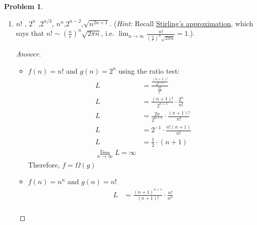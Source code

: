 \documentclass[11pt]{article}
\theoremstyle{definition}
\theoremstyle{definition}
\newtheorem{required}{Problem}
\theoremstyle{definition}
\begin{document}
\begin{required}
\begin{enumerate}[label=(\alph*)]
\begin{proof}[Answer]
        \begin{itemize}
            \item These functions grow at the same asymptotic rate and the slowest:  $4$ and $n^{log_n5}$
            \item This function grows faster than the previous: $f(n) = n^{log_n(n^2)}$
            \item This function grows faster than the previous: $f(n) = n^{log_5n}$
            \item This function grows the fastest: $f(n) = n^{log_3n}$
    \end{itemize}
        \end{proof}
        \newpage

\subsection{Problem 2\ref{2b}}
        \item \label{2b} $n!$ , \qquad $2^n$ ,\qquad  $2^{n/3}$, \qquad  $n^n$,\qquad $2^{n-2}$,\qquad  $\sqrt{n^{2n+1}}$. (\emph{Hint:} Recall \href{https://en.wikipedia.org/wiki/Stirling\%27s_approximation}{Stirling's approximation}, which says that $n! \sim \left(\frac{n}{e}\right)^n \sqrt{2 \pi n}$, i.e. $\lim_{n \to \infty} \frac{n!}{\left(\frac{n}{e}\right)^n \sqrt{2 \pi n}} = 1$.).
        \begin{proof}[Answer]
        \begin{itemize}
            \item $f(n) = n!$ and $g(n) = 2^n$ using the ratio test: 
            \begin{align*}
                L  &= \frac{\frac{(n+1)!}{2^{n+1}}}{\frac{n!}{2^n}} \\
                L &= \frac{(n+1)!}{2^{n+1}} \cdot \frac{2^n}{n!} \\
                L &= \frac{2n}{2^{n+1}} \cdot \frac{(n+1)!}{n!} \\
                L &= 2^{-1} \cdot \frac{n!(n+1)}{n!} \\
                L &=\frac{1}{2} \cdot (n+1) \\
                \lim_{n \to \infty} L = \infty
            \end{align*}
            Therefore, $f=\Omega (g)$
            \item  $f(n) = n^n$ and $g(n) = n!$
            \begin{align*}
                L &= \frac{(n+1)^{n+1}}{(n+1)!} \cdot \frac{n!}{n^n} \\

\end{align*}
\end{itemize}
\end{proof}
\end{enumerate}
\end{required}
\end{document}
